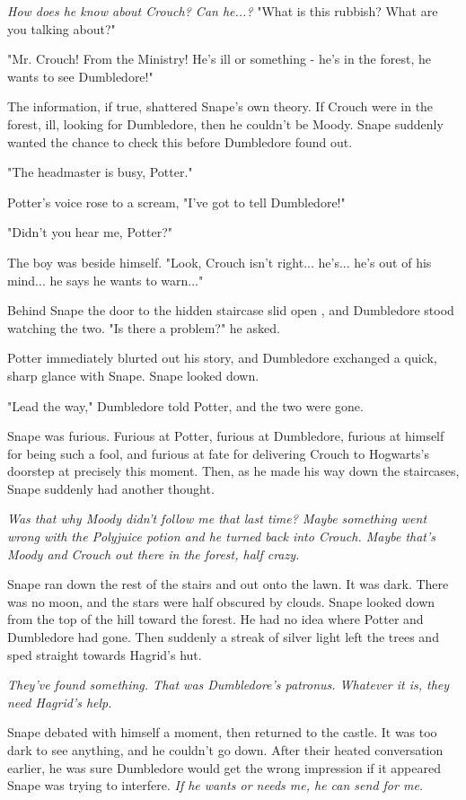\emph{How does he know about Crouch? Can he...?} "What is this rubbish? What are you talking about?"

"Mr. Crouch! From the Ministry! He's ill or something - he's in the forest, he wants to see Dumbledore!"

The information, if true, shattered Snape's own theory. If Crouch were in the forest, ill, looking for Dumbledore, then he couldn't be Moody. Snape suddenly wanted the chance to check this before Dumbledore found out.

"The headmaster is busy, Potter."

Potter's voice rose to a scream, "I've got to tell Dumbledore!"

"Didn't you hear me, Potter?"

The boy was beside himself. "Look, Crouch isn't right... he's... he's out of his mind... he says he wants to warn..."

Behind Snape the door to the hidden staircase slid open , and Dumbledore stood watching the two. "Is there a problem?" he asked.

Potter immediately blurted out his story, and Dumbledore exchanged a quick, sharp glance with Snape. Snape looked down.

"Lead the way," Dumbledore told Potter, and the two were gone.

Snape was furious. Furious at Potter, furious at Dumbledore, furious at himself for being such a fool, and furious at fate for delivering Crouch to Hogwarts's doorstep at precisely this moment. Then, as he made his way down the staircases, Snape suddenly had another thought.

\emph{Was that why Moody didn't follow me that last time? Maybe something went wrong with the Polyjuice potion and he turned back into Crouch. Maybe that's Moody and Crouch out there in the forest, half crazy.}

Snape ran down the rest of the stairs and out onto the lawn. It was dark. There was no moon, and the stars were half obscured by clouds. Snape looked down from the top of the hill toward the forest. He had no idea where Potter and Dumbledore had gone. Then suddenly a streak of silver light left the trees and sped straight towards Hagrid's hut.

\emph{They've found something. That was Dumbledore's patronus. Whatever it is, they need Hagrid's help.}

Snape debated with himself a moment, then returned to the castle. It was too dark to see anything, and he couldn't go down. After their heated conversation earlier, he was sure Dumbledore would get the wrong impression if it appeared Snape was trying to interfere. \emph{If he wants or needs me, he can send for me.}

